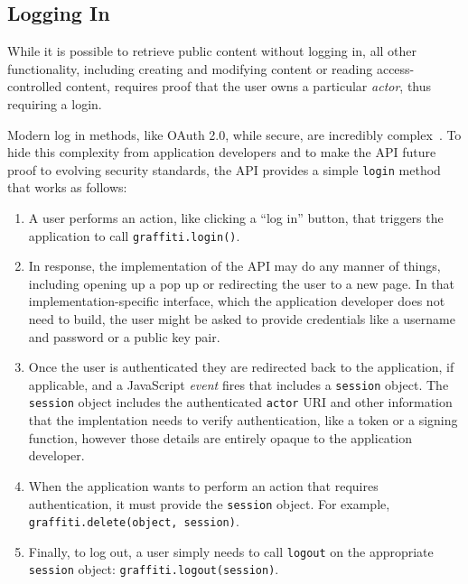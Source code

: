 
\subsection{Logging In}

While it is possible to retrieve public content without logging in,
all other functionality, including
creating and modifying content or reading access-controlled content,
requires proof that the user owns a particular \emph{actor}, thus requiring a login.

Modern log in methods, like OAuth 2.0, while secure, are incredibly complex~\cite{oauth}.
To hide this complexity from application developers and to make the API future proof
to evolving security standards, the API provides a simple \texttt{login} method that works as follows:

\begin{enumerate}
\item
A user performs an action, like clicking a ``log in'' button, that triggers
the application to call \texttt{graffiti.login()}.
\item
In response, the implementation of the API may do any manner of things,
including opening up a pop up or redirecting the user to a new page.
In that implementation-specific interface, which the application developer
does not need to build, the user might be asked to provide credentials like a username
and password or a public key pair.
\item
Once the user is authenticated they are redirected back to the application, if applicable,
and a JavaScript \emph{event} fires that includes
a \texttt{session} object. The \texttt{session} object includes the authenticated \texttt{actor}
URI and other information that the implentation needs to verify authentication, like
a token or a signing function, however those details are entirely opaque to the application developer.
\item
When the application wants to perform an action that requires authentication,
it must provide the \texttt{session} object. For example,
\texttt{graffiti.delete(object, session)}.
\item
Finally, to log out, a user simply needs to call \texttt{logout} on the appropriate
\texttt{session} object: \texttt{graffiti.logout(session)}.
\end{enumerate}

